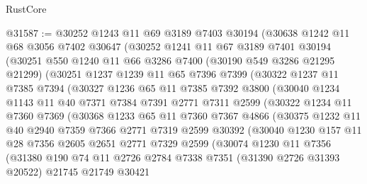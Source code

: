 \begin{lexlean}{RustCore}
\begin{coremodule}
@31587 := @30252
    @1243
    @11
    @69
    @3189
    @7403
    @30194
    (@30638
      @1242
      @11
      @68
      @3056
      @7402
      @30647
      (@30252
        @1241
        @11
        @67
        @3189
        @7401
        @30194
        (@30251
          @550
          @1240
          @11
          @66
          @3286
          @7400
          (@30190 @549 @3286 @21295 @21299)
          (@30251
            @1237
            @1239
            @11
            @65
            @7396
            @7399
            (@30322
              @1237
              @11
              @7385
              @7394
              (@30327
                @1236
                @65
                @11
                @7385
                @7392
                @3800
                (@30040
                  @1234
                  @1143
                  @11
                  @40
                  @7371
                  @7384
                  @7391
                  @2771
                  @7311
                  @2599
                  (@30322
                    @1234
                    @11
                    @7360
                    @7369
                    (@30368
                      @1233
                      @65
                      @11
                      @7360
                      @7367
                      @4866
                      (@30375
                        @1232
                        @11
                        @40
                        @2940
                        @7359
                        @7366
                        @2771
                        @7319
                        @2599
                        @30392
                        (@30040
                          @1230
                          @157
                          @11
                          @28
                          @7356
                          @2605
                          @2651
                          @2771
                          @7329
                          @2599
                          (@30074
                            @1230
                            @11
                            @7356
                            (@31380
                              @190
                              @74
                              @11
                              @2726
                              @2784
                              @7338
                              @7351
                              (@31390 @2726 @31393 @20522)
                              @21745
                              @21749
                              @30421

\end{coremodule}
\end{lexlean}
